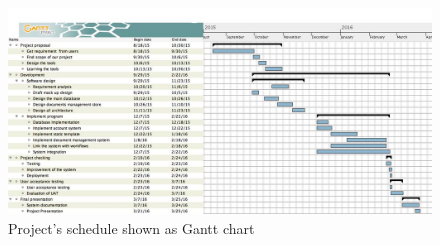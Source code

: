 \begin{landscape}
\begin{figure}
\centering
\caption{Project's schedule shown as Gantt chart}
\label{fig:project-schedule}
\includegraphics[scale=0.45]{res/project_plan}
\end{figure}
\end{landscape}
